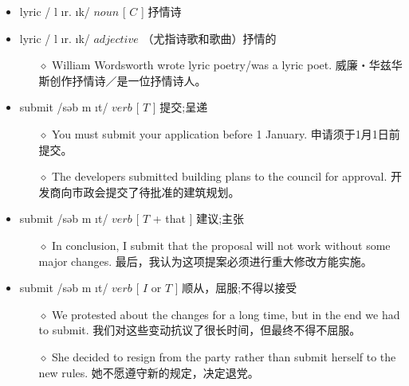 \documentclass[a4paper,top=2.5cm,buttom=2.5cm10.5pt]{book}
\begin{document}
\begin{itemize}
\item lyric / \textprimstress l \i r. \i k/ $ noun $ [  $ C $  ] 抒情诗
\end{itemize}
\begin{itemize}
\item lyric / \textprimstress l \i r. \i k/ $ adjective $  （尤指诗歌和歌曲）抒情的
\begin{itemize}
\item[$\diamond$] William Wordsworth wrote lyric poetry/was a lyric poet.
威廉‧华兹华斯创作抒情诗／是一位抒情诗人。
\end{itemize}
\end{itemize}
\begin{itemize}
\item submit /səb \textprimstress m \i t/ $ verb $ [  $ T $  ] 提交;呈递
\begin{itemize}
\item[$\diamond$] You must submit your application before 1 January.
申请须于1月1日前提交。
\item[$\diamond$] The developers submitted building plans to the council for approval.
开发商向市政会提交了待批准的建筑规划。
\end{itemize}
\end{itemize}
\begin{itemize}
\item submit /səb \textprimstress m \i t/ $ verb $ [  $ T $  + that ] 建议;主张
\begin{itemize}
\item[$\diamond$] In conclusion, I submit that the proposal will not work without some major changes.
最后，我认为这项提案必须进行重大修改方能实施。
\end{itemize}
\end{itemize}
\begin{itemize}
\item submit /səb \textprimstress m \i t/ $ verb $ [  $ I $  or  $ T $  ] 顺从，屈服;不得以接受
\begin{itemize}
\item[$\diamond$] We protested about the changes for a long time, but in the end we had to submit.
我们对这些变动抗议了很长时间，但最终不得不屈服。
\item[$\diamond$] She decided to resign from the party rather than submit herself to the new rules.
她不愿遵守新的规定，决定退党。
\end{itemize}
\end{itemize}
\end{document}
